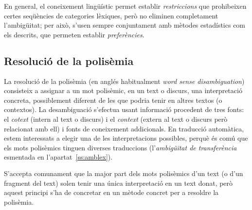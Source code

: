 En general, el coneixement lingüístic permet establir
\emph{restriccions} que prohibeixen certes seqüències de categories
lèxiques, però no eliminen completament l'ambigüitat; per això, s'usen
sempre conjuntament amb mètodes estadístics com els descrits, que
permeten establir \emph{preferències}.

\subsection{Resolució de la polisèmia}


La resolució de la polisèmia (en anglés habitualment \emph{word sense
  disambiguation}) consisteix a assignar a un mot polisèmic, en un
text o discurs, una interpretació concreta, possiblement diferent de
les que podria tenir en altres textos (o contextos). La desambiguació
s'efectua usant informació procedent de tres fonts: el \emph{cotext}
(intern al text o discurs) i el \emph{context} (extern al text o
discurs però relacionat amb ell) i fonts de coneixement addicionals.
En traducció automàtica, estem interessats a elegir una de les
interpretacions possibles, perquè és comú que els mots polisèmics
tinguen diverses traduccions (l'\emph{ambigüitat de transferència}
esmentada en l'apartat~\ref{ss:amblex}).

S'accepta comunament que la major part dels mots polisèmics d'un text
(o d'un fragment del text) solen tenir una única interpretació en un
text donat, però aquest principi s'ha de concretar en un mètode
concret per a resoldre la polisèmia.
 
